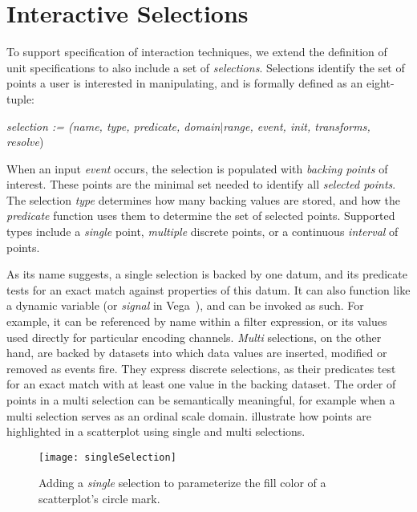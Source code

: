 \section{Interactive Selections}
\label{sec:vl:goi}

To support specification of interaction techniques, we extend the definition of
unit specifications to also include a set of \emph{selections}. Selections
identify the set of points a user is interested in manipulating, and is formally
defined as an eight-tuple:

\centerline{
  \emph{selection := (name, type, predicate, domain$|$range, event, init,
  transforms, resolve})
}

When an input \emph{event} occurs, the selection is populated with \emph{backing
points} of interest. These points are the minimal set needed to identify all
\emph{selected points}. The selection \emph{type} determines how many backing
values are stored, and how the \emph{predicate} function uses them to determine
the set of selected points. Supported types include a \emph{single} point,
\emph{multiple} discrete points, or a continuous \emph{interval} of points.

As its name suggests, a single selection is backed by one datum, and its
predicate tests for an exact match against properties of this datum. It can also
function like a dynamic variable (or \emph{signal} in
Vega~\cite{reactive-vega-model}), and can be invoked as such. For example, it
can be referenced by name within a filter expression, or its values used
directly for particular encoding channels. \emph{Multi} selections, on the other
hand, are backed by datasets into which data values are inserted, modified or
removed as events fire. They express discrete selections, as their predicates
test for an exact match with at least one value in the backing dataset. The
order of points in a multi selection can be semantically meaningful, for example
when a multi selection serves as an ordinal scale domain.
 illustrate how points are
highlighted in a scatterplot using single and multi selections.

\begin{figure*}[h!]
  \centering
  \texttt{[image: singleSelection]}
  \caption{Adding a \emph{single} selection to parameterize the fill color
  of a scatterplot's circle mark.}
  \label{fig:vl:singleSelection}
\end{figure*}

